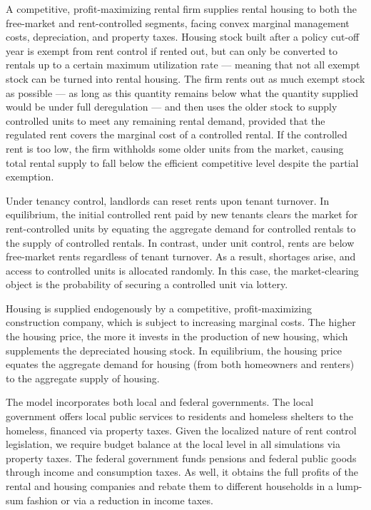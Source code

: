 \documentclass[parskip=full]{article}
\begin{document}
A competitive, profit-maximizing rental firm supplies rental housing to both the free-market and rent-controlled segments, facing convex marginal management costs, depreciation, and property taxes. Housing stock built after a policy cut-off year is exempt from rent control if rented out, but can only be converted to rentals up to a certain maximum utilization rate — meaning that not all exempt stock can be turned into rental housing. The firm rents out as much exempt stock as possible — as long as this quantity remains below what the quantity supplied would be under full deregulation — and then uses the older stock to supply controlled units to meet any remaining rental demand, provided that the regulated rent covers the marginal cost of a controlled rental. If the controlled rent is too low, the firm withholds some older units from the market, causing total rental supply to fall below the efficient competitive level despite the partial exemption.

Under tenancy control, landlords can reset rents upon tenant turnover. In equilibrium, the initial controlled rent paid by new tenants clears the market for rent-controlled units by equating the aggregate demand for controlled rentals to the supply of controlled rentals. In contrast, under unit control, rents are below free-market rents regardless of tenant turnover. As a result, shortages arise, and access to controlled units is allocated randomly. In this case, the market-clearing object is the probability of securing a controlled unit via lottery.

Housing is supplied endogenously by a competitive, profit-maximizing construction company, which is subject to increasing marginal costs. The higher the housing price, the more it invests in the production of new housing, which supplements the depreciated housing stock. In equilibrium, the housing price equates the aggregate demand for housing (from both homeowners and renters) to the aggregate supply of housing.

The model incorporates both local and federal governments. The local government offers local public services to residents and homeless shelters to the homeless, financed via property taxes. Given the localized nature of rent control legislation, we require budget balance at the local level in all simulations via property taxes. The federal government funds pensions and federal public goods through income and consumption taxes. As well, it obtains the full profits of the rental and housing companies and rebate them to different households in a lump-sum fashion or via a reduction in income taxes. 
\end{document}
